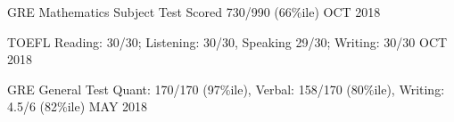 

\begin{cvhonors}

  \cvhonor
    {GRE Mathematics Subject Test} %
    {Scored 730/990 (66\%ile)} %
    {} %
    {OCT 2018} %

  \cvhonor
    {TOEFL} %
    {Reading: 30/30; Listening: 30/30, Speaking 29/30; Writing: 30/30} %
    {} %
    {OCT 2018} %

  \cvhonor
    {GRE General Test} %
    {Quant: 170/170 (97\%ile), Verbal: 158/170 (80\%ile), Writing: 4.5/6 (82\%ile)} %
    {} %
    {MAY 2018} %

\end{cvhonors}
